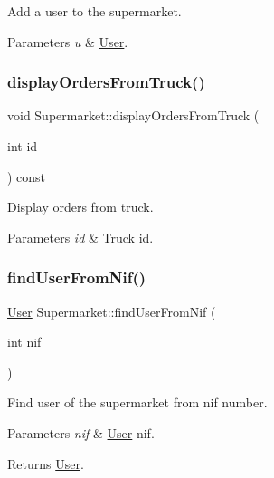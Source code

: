 Add a user to the supermarket. 


\begin{DoxyParams}{Parameters}
{\em u} & \hyperlink{class_user}{User}. \\
\hline
\end{DoxyParams}
\mbox{\label{class_supermarket_a181298e23d410a1db1b257780044bdd7}} 
\subsubsection{\texorpdfstring{display\+Orders\+From\+Truck()}{displayOrdersFromTruck()}}
{\footnotesize\ttfamily void Supermarket\+::display\+Orders\+From\+Truck (\begin{DoxyParamCaption}\item[{int}]{id }\end{DoxyParamCaption}) const}



Display orders from truck. 


\begin{DoxyParams}{Parameters}
{\em id} & \hyperlink{class_truck}{Truck} id. \\
\hline
\end{DoxyParams}
\mbox{\label{class_supermarket_ab900c1e7be95d28533e93dff117fc277}} 
\subsubsection{\texorpdfstring{find\+User\+From\+Nif()}{findUserFromNif()}}
{\footnotesize\ttfamily \hyperlink{class_user}{User} Supermarket\+::find\+User\+From\+Nif (\begin{DoxyParamCaption}\item[{int}]{nif }\end{DoxyParamCaption})}



Find user of the supermarket from nif number. 


\begin{DoxyParams}{Parameters}
{\em nif} & \hyperlink{class_user}{User} nif.\\
\hline
\end{DoxyParams}
\begin{DoxyReturn}{Returns}
\hyperlink{class_user}{User}. 
\end{DoxyReturn}
\mbox{\label{class_supermarket_a83e6d49d86781085d1dcfef8d48a26c1}} 
